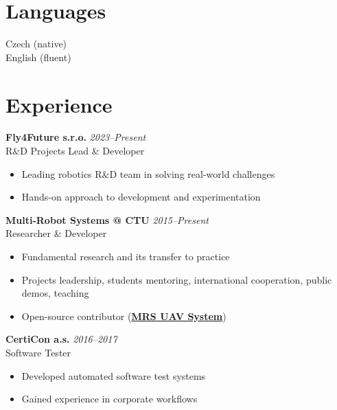 \documentclass[12pt,a4paper]{article}
\newcommand\Colorhreff[3][reff]{\href{#2}{\color{#1}#3}}
\begin{document}
\begin{paracol}{2}
\vspace{0.6em}
\section*{Languages}
Czech (native)\\
English (fluent)

\switchcolumn

\color{primary}

\vspace{-0.5cm}
\section*{Experience}

\textbf{Fly4Future s.r.o.} \hfill \textit{2023–Present} \\
R\&D Projects Lead \& Developer
\begin{itemize}
  \item Leading robotics R\&D team in solving real-world challenges
  \item Hands-on approach to development and experimentation
\end{itemize}

\vspace{0.5cm}
\noindent
\textbf{Multi-Robot Systems @ CTU} \hfill \textit{2015–Present} \\
Researcher \& Developer
\begin{itemize}
  \item Fundamental research and its transfer to practice
  \item Projects leadership, students mentoring, international cooperation, public demos, teaching
  \item Open-source contributor (\Colorhreff{https://github.com/ctu-mrs/mrs_uav_system}{\textbf{MRS UAV System}})
\end{itemize}

\vspace{0.5cm}
\noindent
\textbf{CertiCon a.s.} \hfill \textit{2016–2017} \\
Software Tester
\begin{itemize}
  \item Developed automated software test systems
  \item Gained experience in corporate workflows
\end{itemize}


\end{paracol}
\end{document}

